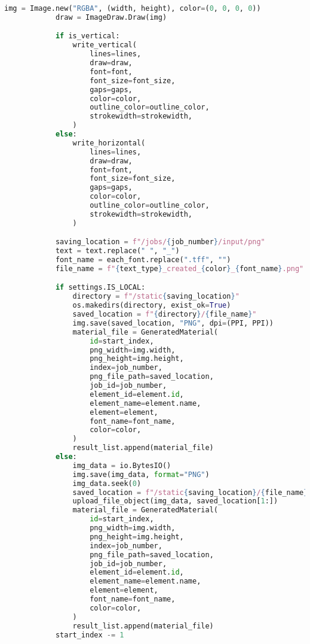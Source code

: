 \begin{lstlisting}[language=Python,caption={Text-ээс PNG зураг үүсгэдэг script},frame=single]
            img = Image.new("RGBA", (width, height), color=(0, 0, 0, 0))
            draw = ImageDraw.Draw(img)

            if is_vertical:
                write_vertical(
                    lines=lines,
                    draw=draw,
                    font=font,
                    font_size=font_size,
                    gaps=gaps,
                    color=color,
                    outline_color=outline_color,
                    strokewidth=strokewidth,
                )
            else:
                write_horizontal(
                    lines=lines,
                    draw=draw,
                    font=font,
                    font_size=font_size,
                    gaps=gaps,
                    color=color,
                    outline_color=outline_color,
                    strokewidth=strokewidth,
                )

            saving_location = f"/jobs/{job_number}/input/png"
            text = text.replace(" ", "_")
            font_name = each_font.replace(".tff", "")
            file_name = f"{text_type}_created_{color}_{font_name}.png"

            if settings.IS_LOCAL:
                directory = f"/static{saving_location}"
                os.makedirs(directory, exist_ok=True)
                saved_location = f"{directory}/{file_name}"
                img.save(saved_location, "PNG", dpi=(PPI, PPI))
                material_file = GeneratedMaterial(
                    id=start_index,
                    png_width=img.width,
                    png_height=img.height,
                    index=job_number,
                    png_file_path=saved_location,
                    job_id=job_number,
                    element_id=element.id,
                    element_name=element.name,
                    element=element,
                    font_name=font_name,
                    color=color,
                )
                result_list.append(material_file)
            else:
                img_data = io.BytesIO()
                img.save(img_data, format="PNG")
                img_data.seek(0)
                saved_location = f"/static{saving_location}/{file_name}"
                upload_file_object(img_data, saved_location[1:])
                material_file = GeneratedMaterial(
                    id=start_index,
                    png_width=img.width,
                    png_height=img.height,
                    index=job_number,
                    png_file_path=saved_location,
                    job_id=job_number,
                    element_id=element.id,
                    element_name=element.name,
                    element=element,
                    font_name=font_name,
                    color=color,
                )
                result_list.append(material_file)
            start_index -= 1


\end{lstlisting}
